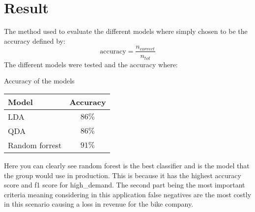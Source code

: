 \section{Result}

The method used to evaluate the different models where simply chosen to be the accuracy defined by:
\begin{equation*}
    \text{accuracy} = \frac{n_{correct}}{n_{tot}}
\end{equation*}
The different models were tested and the accuracy where:
\\
\begin{table*}[h]
    \begin{center}
        Accuracy of the models
        \\
        \begin{tabular}{|l|c|}
            \hline
            Model & Accuracy \\
            \hline
            LDA & $86\%$ \\
            QDA & $86\%$ \\
            Random forrest & $91\%$\\
            \hline
        \end{tabular}
    \end{center}
\end{table*}
Here you can clearly see random forest is the best classifier and is the model that the group would use in production.
This is because it has the highest accuracy score and f1 score for high_demand.
The second part being the most important criteria meaning considering in this application false negatives are the most costly in this scenario causing a loss in revenue for the bike company. 
